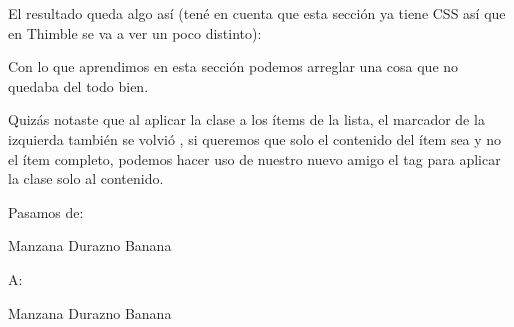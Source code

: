 \documentclass[letterpaper,10pt,spanish]{sphinxmanual}
\begin{document}
El resultado queda algo así (tené en cuenta que esta sección ya tiene CSS así
que en Thimble se va a ver un poco distinto):



Con lo que aprendimos en esta sección podemos arreglar una cosa que no quedaba
del todo bien.

Quizás notaste que al aplicar la clase  a los ítems de la lista, el
marcador de la izquierda también se volvió , si queremos que solo el
contenido del ítem sea  y no el ítem completo, podemos hacer uso de
nuestro nuevo amigo el tag  para aplicar la clase solo al contenido.

Pasamos de:

%
\begin{sphinxVerbatim}[commandchars=\\\{\}]
   Manzana
  Durazno
   Banana
\end{sphinxVerbatim}



A:

%
\begin{sphinxVerbatim}[commandchars=\\\{\}]
   Manzana
  Durazno
   Banana
\end{sphinxVerbatim}
\end{document}
